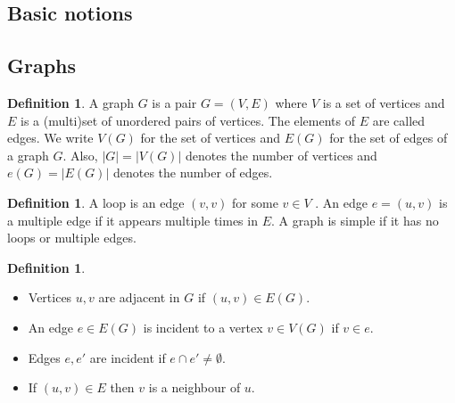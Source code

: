 \documentclass[10pt, fleqn, a4paper, landscape]{article}
\theoremstyle{plain} %
\theoremstyle{remark} %
\theoremstyle{definition} %
\newtheorem{defi}[thm]{Definition}
\begin{document}
\setlength{\abovedisplayskip}{0pt}
\setlength{\belowdisplayskip}{0pt}
\setlength{\abovedisplayshortskip}{0pt}
\setlength{\belowdisplayshortskip}{0pt}

\begin{multicols}{3}
\begin{tiny}

\section{Basic notions}
\subsection{Graphs}
\begin{defi}
A graph $G$ is a pair $G = (V,E)$ where $V$ is a set of vertices and $E$ is a (multi)set of unordered pairs of vertices. The elements of $E$ are called edges. We write $V (G)$ for the set of vertices and $E(G)$ for the set of edges of a graph $G$. Also, $|G| = |V (G)|$ denotes the number of
vertices and $e(G) = |E(G)|$ denotes the number of edges.
\end{defi}
\begin{defi}
A loop is an edge $(v, v)$ for some $v\in V$ . An edge $e = (u, v)$ is a multiple edge if it appears multiple times in $E$. A graph is simple if it has no loops or multiple edges.
\end{defi}
\begin{defi}
\begin{itemize}
\item Vertices $u, v$ are adjacent in $G$ if $(u, v)\in E(G)$.
\item An edge $e \in E(G)$ is incident to a vertex $v \in V (G)$ if $v \in e$.
\item Edges $e, e'$ are incident if $e\cap e'\ne \emptyset$.
\item If $(u, v) \in E $ then $v$ is a neighbour of $u$.
\end{itemize}
\end{defi}
\addtocounter{thm}{1}


\end{tiny}
\end{multicols}
\end{document}
